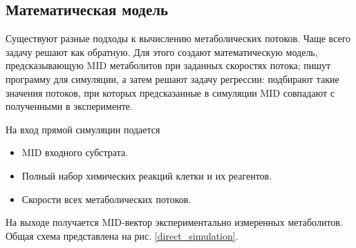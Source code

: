 \documentclass[14pt, a4paper]{extreport}
\begin{document}
\subsection{Математическая модель}
Существуют разные подходы к вычислению метаболических потоков. Чаще всего задачу решают как обратную. Для этого создают математическую модель, предсказывающую MID метаболитов при заданных скоростях потока; пишут программу для симуляции, а затем решают задачу регрессии: подбирают такие значения потоков, при которых предсказанные в симуляции MID совпадают с полученными в эксперименте. 

На вход прямой симуляции подается 
\begin{itemize}
	\item MID входного субстрата.
	\item Полный набор химических реакций клетки и их реагентов.
	\item Скорости всех метаболических потоков.
\end{itemize}
На выходе получается MID-вектор экспериментально измеренных метаболитов. Общая схема представлена на рис. \ref{direct_simulation}.
\end{document}
